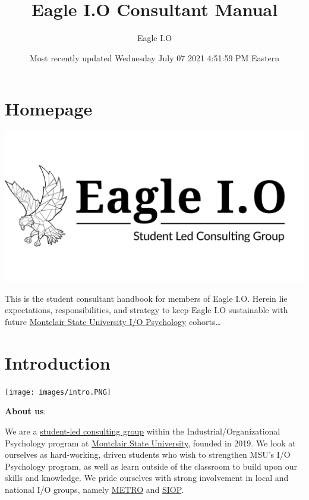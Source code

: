 \documentclass[
]{book}
\title{Eagle I.O Consultant Manual}
\author{Eagle I.O}
\date{Most recently updated Wednesday July 07 2021 4:51:59 PM Eastern}
\begin{document}
\maketitle

{
\setcounter{tocdepth}{4}
\tableofcontents
}
\hypertarget{homepage}{%
\chapter*{Homepage}\label{homepage}}

\includegraphics{images/eagleio dot.jpg}

This is the student consultant handbook for members of Eagle I.O. Herein lie expectations, responsibilities, and strategy to keep Eagle I.O sustainable with future \href{https://www.montclair.edu/psychology/graduate-programs/industrial-organizational-psychology/}{Montclair State University I/O Psychology} cohorts\ldots{}

\hypertarget{introduction}{%
\chapter{Introduction}\label{introduction}}

\texttt{[image: images/intro.PNG]}

\textbf{About us}:

We are a \href{https://eagle-io.weebly.com/}{student-led consulting group} within the Industrial/Organizational Psychology program at \href{https://www.montclair.edu/psychology/graduate-programs/industrial-organizational-psychology/}{Montclair State University}, founded in 2019. We look at ourselves as hard-working, driven students who wish to strengthen MSU's I/O Psychology program, as well as learn outside of the classroom to build upon our skills and knowledge. We pride ourselves with strong involvement in local and national I/O groups, namely \href{https://metroapppsych.com/}{METRO} and \href{https://siop.org}{SIOP}.
\end{document}
